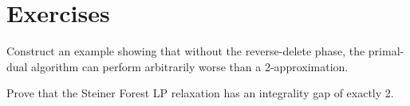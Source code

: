 \section{Exercises}
\begin{exercise}
Construct an example showing that without the reverse-delete phase, the primal-dual algorithm can perform arbitrarily worse than a 2-approximation.
\end{exercise}
\begin{exercise}
Prove that the Steiner Forest LP relaxation has an integrality gap of exactly 2.
\end{exercise}

